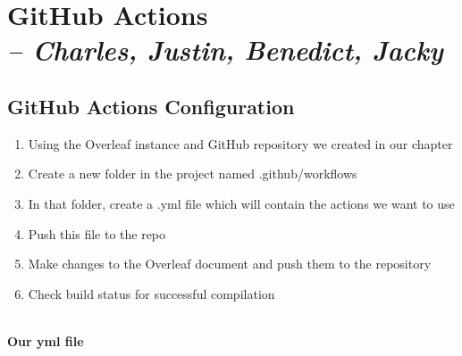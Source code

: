 \chapter[GitHub Actions]{GitHub Actions \\\small{\textit{-- Charles, Justin, Benedict, Jacky}}}
\label{Chapter::GitHub Actions}

\section{GitHub Actions Configuration}

\begin{enumerate}
    \item Using the Overleaf instance and GitHub repository we created in our   chapter 
    \item Create a new folder in the project named .github/workflows
    \item In that folder, create a .yml file which will contain the actions we want to use
    \item Push this file to the repo 
    \item Make changes to the Overleaf document and push them to the repository
    \item Check build status for successful compilation
\end{enumerate}
\\
\textbf{Our yml file}
